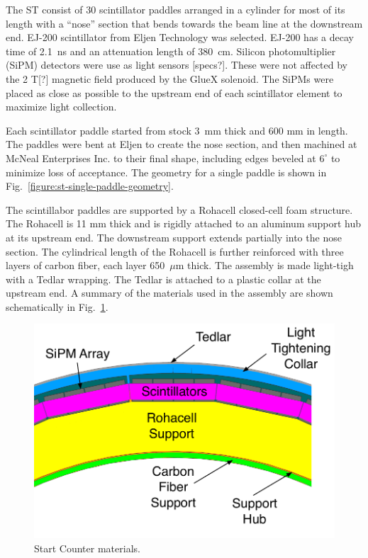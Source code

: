 The ST consist of 30 scintillator paddles arranged in a cylinder for most of
its length with a ``nose'' section that bends towards the beam line at
the downstream end. EJ-200 scintillator from Eljen
Technology\cite{EljenTech} was selected. EJ-200 has a decay time
of 2.1~ns and an attenuation length of 380~cm. Silicon
photomultiplier (SiPM) detectors were use as light sensors [specs?]. These were
not affected by the 2 T[?] magnetic field produced by the GlueX
solenoid. The SiPMs were placed as close as possible to the upstream
end of each scintillator element to maximize light collection.

Each scintillator paddle started from stock 3~mm thick and 600 mm in
length. The paddles were bent at Eljen to create the nose section, and
then machined at McNeal Enterprises Inc.\cite{mcneal-reference} to
their final shape, including edges beveled at $6^\circ$ to minimize
loss of acceptance. The geometry for a single paddle is shown in
Fig.~\ref{figure:st-single-paddle-geometry}.

The scintillabor paddles are supported by a Rohacell closed-cell foam
structure. The Rohacell is 11 mm thick and is rigidly attached to an
aluminum support hub at its upstream end. The downstream support
extends partially into the nose section. The cylindrical length of the
Rohacell is further reinforced with three layers of carbon fiber, each
layer 650~$\mu$m thick. The assembly is made light-tigh with a Tedlar
wrapping. The Tedlar is attached to a plastic collar at the upstream
end. A summary of the materials used in the assembly are shown
schematically in Fig.~\ref{fig:st-materials}.

\begin{figure}[!htb]
  \centering
  \includegraphics[width=1.0\columnwidth]{figures/st_materials.pdf}
  \caption{Start Counter materials.}
  \label{fig:st-materials}
\end{figure}

